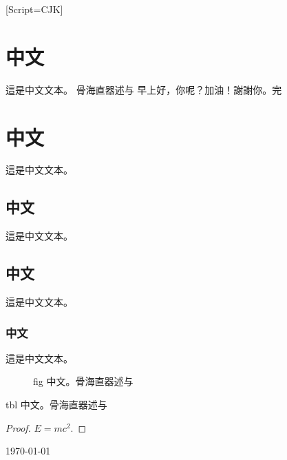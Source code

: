 \documentclass[11pt]{article}
\begin{document}
\renewfontfamily{}[Script=CJK]
\begin{chinese}[variant=traditional,numerals=chinese]
\section{中文}
這是中文文本。
骨海直器述与 早上好，你呢？加油！謝謝你。完
\section{中文}
這是中文文本。
\subsection{中文}
這是中文文本。
\subsection{中文}
這是中文文本。
\subsubsection{中文}
這是中文文本。

\begin{figure}
\caption{fig 中文。骨海直器述与}
\end{figure}
\begin{table}
\caption{tbl 中文。骨海直器述与}
\end{table}
\begin{proof}
$E = mc^2.$
\end{proof}

\today
\end{chinese}
\end{document}
